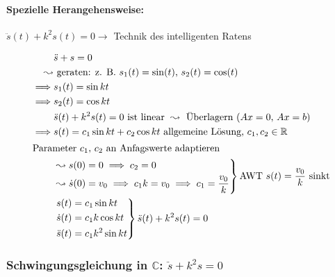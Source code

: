\paragraph{Spezielle Herangehensweise:} $\ddot s(t) + k^2s(t) = 0 \rightarrow$ Technik des intelligenten Ratens

\begin{example}[für $k = 1$]
\begin{align*}
	& \ddot s + s = 0 \\
	\leadsto &\text{ geraten: z. B. $s_1(t) = \sin(t)$, $s_2(t) = \cos(t)$}\\
	\implies &s_1(t) = \sin kt \\
	\implies &s_2(t) = \cos kt \\
	& \ddot s(t) + k^2s(t) = 0 \text { ist linear } \leadsto \text{ Überlagern ($Ax = 0$, $Ax = b$)} \\
	\implies &s(t) = c_1 \sin kt + c_2 \cos kt \text{ allgemeine Lösung, $c_1, c_2 \in \mathbb{R}$} \\
	\intertext{Parameter $c_1$, $c_2$ an Anfagswerte adaptieren}
	&\left. \begin{aligned}
		\leadsto s(0) &= 0 \implies c_2 = 0 \\
		\leadsto \dot s(0) &= v_0 \implies c_1k = v_0 \implies c_1 = \frac{v_0}{k}
	\end{aligned} \right\} \text {AWT $s(t) = \frac{v_0}{k}$ sinkt} \\
	&\left. \begin{aligned}
		s(t) &= c_1 \sin kt \\
		\dot s(t) &= c_1k \cos kt \\
		\ddot s(t) &= c_1k^2 \sin kt
	\end{aligned} \right\}\ddot s(t) + k^2s(t) = 0
\end{align*}
\end{example}

\subsubsection*{Schwingungsgleichung in $\mathbb{C}$: $\ddot s + k^2s = 0$}

